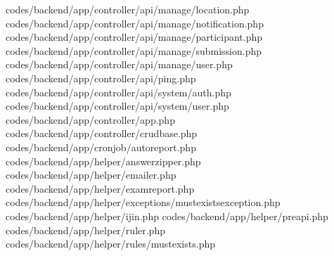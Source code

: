 codes/backend/app/controller/api/manage/location.php
codes/backend/app/controller/api/manage/notification.php
codes/backend/app/controller/api/manage/participant.php
codes/backend/app/controller/api/manage/submission.php
codes/backend/app/controller/api/manage/user.php
codes/backend/app/controller/api/ping.php
codes/backend/app/controller/api/system/auth.php
codes/backend/app/controller/api/system/user.php
codes/backend/app/controller/app.php
codes/backend/app/controller/crudbase.php
codes/backend/app/cronjob/autoreport.php
codes/backend/app/helper/answerzipper.php
codes/backend/app/helper/emailer.php
codes/backend/app/helper/examreport.php
codes/backend/app/helper/exceptions/mustexistsexception.php
codes/backend/app/helper/ijin.php
codes/backend/app/helper/preapi.php
codes/backend/app/helper/ruler.php
codes/backend/app/helper/rules/mustexists.php
